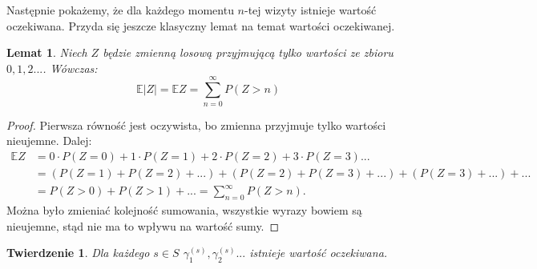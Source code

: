 \documentclass[a4paper]{article}
\theoremstyle{defn}
\theoremstyle{theorem}
\newtheorem{theorem}[defn]{Twierdzenie}
\theoremstyle{lemma}
\newtheorem{lemma}[defn]{Lemat}
\theoremstyle{cor}
\theoremstyle{fact}
\begin{document}
Następnie pokażemy, że dla każdego momentu $n$-tej wizyty istnieje wartość oczekiwana. Przyda się jeszcze klasyczny lemat na temat wartości oczekiwanej.
\begin{lemma}\label{lemma2.5.4}
Niech $Z$ będzie zmienną losową przyjmującą tylko wartości ze zbioru $0,1,2...$. Wówczas:
$$\mathbb{E}|Z| = \mathbb{E}Z = \sum\limits_{n = 0}^{\infty} P(Z > n)$$
\end{lemma}
\begin{proof}
Pierwsza równość jest oczywista, bo zmienna przyjmuje tylko wartości nieujemne. Dalej:
\begin{align*}
    \mathbb{E}Z &= 0 \cdot P(Z = 0) + 1 \cdot P(Z = 1) + 2 \cdot P(Z = 2) + 3 \cdot P(Z = 3)... \\
    &= (P(Z = 1) + P(Z = 2) + ...) + (P(Z = 2) + P(Z = 3) + ...) + (P(Z = 3) + ...) + ...\\
    &= P(Z > 0) + P(Z > 1) + ... = \sum\limits_{n = 0}^{\infty} P(Z > n).
\end{align*}
Można było zmieniać kolejność sumowania, wszystkie wyrazy bowiem są nieujemne, stąd nie ma to wpływu na wartość sumy.
\end{proof}
\begin{theorem}\label{theorem2.5.5}
Dla każdego $s\in S$ $\gamma_1^{(s)}, \gamma_2^{(s)}...$ istnieje wartość oczekiwana.
\end{theorem}
\end{document}
